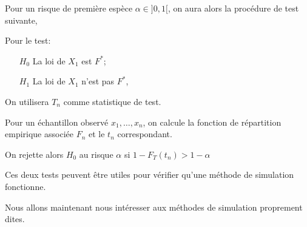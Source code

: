 Pour un risque de première espèce $\alpha \in ]0, 1[$, 
on aura alors la procédure de test suivante, 

Pour le test:
\begin{itemize}
\item[$H_0$] La loi de $X_1$ est $F^*$;
\item[$H_1$] La loi de $X_1$ n'est pas $F^*$,
\end{itemize}
On utilisera $T_n$ comme statistique de test.

Pour un échantillon observé $x_1,\dots, x_n$, on calcule la fonction de répartition empirique associée $F_n$ et le $t_n$ correspondant.

On rejette alors $H_0$ au risque $\alpha$ si $1 - F_T(t_n) > 1- \alpha$
\medskip

Ces deux tests peuvent être utiles pour vérifier qu'une méthode de simulation fonctionne.

Nous allons maintenant nous intéresser aux méthodes de simulation proprement dites.
